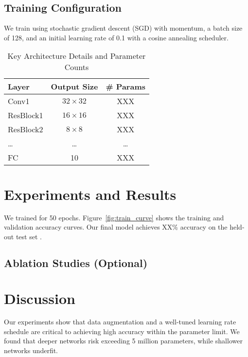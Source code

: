 \documentclass[letterpaper]{article}
\begin{document}
\subsection{Training Configuration}
We train using stochastic gradient descent (SGD) with momentum, a batch size of 128, and an initial learning rate of 0.1 with a cosine annealing scheduler.

\begin{table}[ht]
\centering
\caption{Key Architecture Details and Parameter Counts}
\label{tab:model-params}
\begin{tabular}{lcc}
\toprule
Layer & Output Size & \# Params \\
\midrule
Conv1 & $32 \times 32$ & XXX \\
ResBlock1 & $16 \times 16$ & XXX \\
ResBlock2 & $8 \times 8$   & XXX \\
\ldots & \ldots & \ldots \\
FC & 10 & XXX \\
\bottomrule
\end{tabular}
\end{table}

\section{Experiments and Results}
We trained for 50 epochs. Figure~\ref{fig:train_curve} shows the training and validation accuracy curves. Our final model achieves XX\% accuracy on the held-out test set \cite{author2024}.

\subsection{Ablation Studies (Optional)}

\section{Discussion}
Our experiments show that data augmentation and a well-tuned learning rate schedule are critical to achieving high accuracy within the parameter limit. We found that deeper networks risk exceeding 5 million parameters, while shallower networks underfit.
\end{document}
